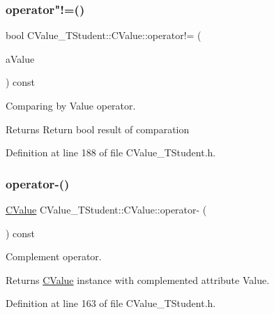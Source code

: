 \subsubsection{\texorpdfstring{operator"!=()}{operator!=()}}
{\footnotesize\ttfamily bool C\+Value\+\_\+\+T\+Student\+::\+C\+Value\+::operator!= (\begin{DoxyParamCaption}\item[{const \hyperlink{class_c_value___t_student_1_1_c_value}{C\+Value} \&}]{a\+Value }\end{DoxyParamCaption}) const\hspace{0.3cm}{\ttfamily [inline]}}



Comparing by Value operator. 

\begin{DoxyReturn}{Returns}
Return {\ttfamily bool} result of comparation 
\end{DoxyReturn}


Definition at line 188 of file C\+Value\+\_\+\+T\+Student.\+h.

\mbox{\label{class_c_value___t_student_1_1_c_value_a7659b2e85b6f304c7a83e2ef4f4c3f8d}} 
\subsubsection{\texorpdfstring{operator-\/()}{operator-()}}
{\footnotesize\ttfamily \hyperlink{class_c_value___t_student_1_1_c_value}{C\+Value} C\+Value\+\_\+\+T\+Student\+::\+C\+Value\+::operator-\/ (\begin{DoxyParamCaption}{ }\end{DoxyParamCaption}) const\hspace{0.3cm}{\ttfamily [inline]}}



Complement operator. 

\begin{DoxyReturn}{Returns}
\hyperlink{class_c_value___t_student_1_1_c_value}{C\+Value} instance with complemented attribute Value. 
\end{DoxyReturn}


Definition at line 163 of file C\+Value\+\_\+\+T\+Student.\+h.

